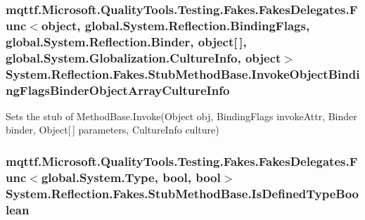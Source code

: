 \hypertarget{class_system_1_1_reflection_1_1_fakes_1_1_stub_method_base_aa17fc9a075d867d17239ee4596a49ba2}{
\subsubsection[{Invoke\-Object\-Binding\-Flags\-Binder\-Object\-Array\-Culture\-Info}]{\setlength{\rightskip}{0pt plus 5cm}mqttf.\-Microsoft.\-Quality\-Tools.\-Testing.\-Fakes.\-Fakes\-Delegates.\-Func$<$object, global.\-System.\-Reflection.\-Binding\-Flags, global.\-System.\-Reflection.\-Binder, object\mbox{[}$\,$\mbox{]}, global.\-System.\-Globalization.\-Culture\-Info, object$>$ System.\-Reflection.\-Fakes.\-Stub\-Method\-Base.\-Invoke\-Object\-Binding\-Flags\-Binder\-Object\-Array\-Culture\-Info}}\label{class_system_1_1_reflection_1_1_fakes_1_1_stub_method_base_aa17fc9a075d867d17239ee4596a49ba2}


Sets the stub of Method\-Base.\-Invoke(\-Object obj, Binding\-Flags invoke\-Attr, Binder binder, Object\mbox{[}$\,$\mbox{]} parameters, Culture\-Info culture)

\hypertarget{class_system_1_1_reflection_1_1_fakes_1_1_stub_method_base_ab141d82bf0df35e233aad5852b4cdf42}{
\subsubsection[{Is\-Defined\-Type\-Boolean}]{\setlength{\rightskip}{0pt plus 5cm}mqttf.\-Microsoft.\-Quality\-Tools.\-Testing.\-Fakes.\-Fakes\-Delegates.\-Func$<$global.\-System.\-Type, bool, bool$>$ System.\-Reflection.\-Fakes.\-Stub\-Method\-Base.\-Is\-Defined\-Type\-Boolean}}\label{class_system_1_1_reflection_1_1_fakes_1_1_stub_method_base_ab141d82bf0df35e233aad5852b4cdf42}


